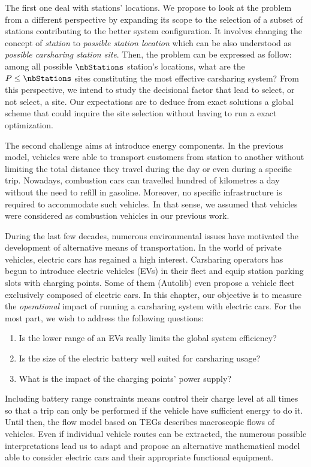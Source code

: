 \begin{bibunit}[ieeetr]
\medskip
The first one deal with stations' locations.
We propose to look at the problem from a different perspective by expanding its scope to the selection of a subset of stations contributing to the better system configuration.
It involves changing the concept of \emph{station} to \emph{possible station location} which can be also understood as \emph{possible carsharing station site}.
Then, the problem can be expressed as follow: among all possible $\nbStations$ station's locations, what are the $P \leq \nbStations$ sites constituting the most effective carsharing system?
From this perspective, we intend to study the decisional factor that lead to select, or not select, a site.
Our expectations are to deduce from exact solutions a global scheme that could inquire the site selection without having to run a exact optimization.

\medskip
The second challenge aims at introduce energy components.
In the previous model, vehicles were able to transport customers from station to another without limiting the total distance they travel during the day or even during a specific trip.
Nowadays, combustion cars can travelled hundred of kilometres a day without the need to refill in gasoline.
Moreover, no specific infrastructure is required to accommodate such vehicles.
In that sense, we assumed that vehicles were considered as combustion vehicles in our previous work.

During the last few decades, numerous environmental issues have motivated the development of alternative means of transportation.
In the world of private vehicles, electric cars has regained a high interest.
Carsharing operators has begun to introduce electric vehicles (EVs) in their fleet and equip station parking slots with charging points.
Some of them (\eg Autolib) even propose a vehicle fleet exclusively composed of electric cars.
In this chapter, our objective is to measure the \emph{operational} impact of running a carsharing system with electric cars.
For the most part, we wish to address the following questions:
\begin{enumerate}
\item Is the lower range of an EVs really limits the global system efficiency?
\item Is the size of the electric battery well suited for carsharing usage?
\item What is the impact of the charging points' power supply?
\end{enumerate}
Including battery range constraints means control their charge level at all times so that a trip can only be performed if the vehicle have sufficient energy to do it.
Until then, the flow model based on TEGs describes macroscopic flows of vehicles.
Even if individual vehicle routes can be extracted, the numerous possible interpretations lead us to adapt and propose an alternative mathematical model able to consider electric cars and their appropriate functional equipment.


\end{bibunit}
